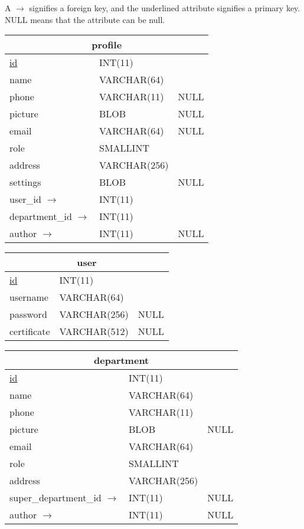 A $ \rightarrow $ signifies a foreign key, and the underlined attribute signifies a primary key. NULL means that the attribute can be null.

\begin{tabular}{|l|l|c|}
\hline
\multicolumn{3}{|c|}{profile} \\
\hline
\underline{id} & INT(11) & \\
name & VARCHAR(64) & \\
phone & VARCHAR(11) & NULL \\
picture & BLOB & NULL \\
email & VARCHAR(64) & NULL \\ 
role & SMALLINT & \\
address & VARCHAR(256) & \\
settings & BLOB & NULL \\
user\_id $ \rightarrow $ & INT(11) & \\
department\_id $ \rightarrow $ & INT(11) & \\
author $ \rightarrow $ & INT(11) & NULL \\
\hline
\end{tabular}

\vspace{10px}

\begin{tabular}{|l|l|c|}
\hline
\multicolumn{3}{|c|}{user} \\
\hline
\underline{id} & INT(11) & \\
username & VARCHAR(64) & \\
password & VARCHAR(256) & NULL \\
certificate & VARCHAR(512) & NULL \\
\hline
\end{tabular}

\vspace{10pt}

\begin{tabular}{|l|l|c|}
\hline
\multicolumn{3}{|c|}{department} \\
\hline
\underline{id} & INT(11) & \\
name & VARCHAR(64) & \\
phone & VARCHAR(11) & \\
picture & BLOB & NULL \\
email & VARCHAR(64) & \\ 
role & SMALLINT & \\
address & VARCHAR(256) & \\
super\_department\_id $ \rightarrow $& INT(11) & NULL \\
author $ \rightarrow $& INT(11) & NULL \\
\hline
\end{tabular}

